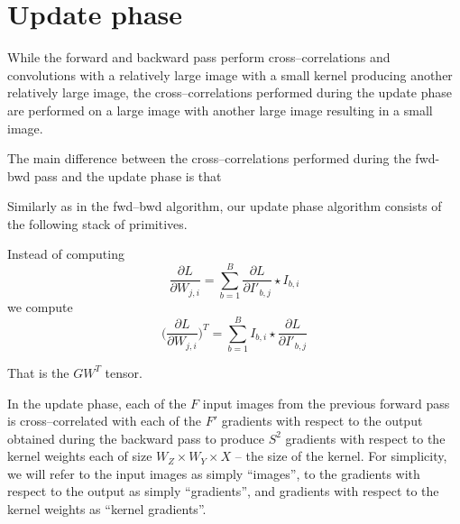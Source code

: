 \section{Update phase}

  While the forward and backward pass perform cross--correlations and
  convolutions with a relatively large image with a small kernel
  producing another relatively large image, the cross--correlations
  performed during the update phase are performed on a large image
  with another large image resulting in a small image.

  The main difference between the cross--correlations performed during
  the fwd-bwd pass and the update phase is that

Similarly as in the fwd--bwd algorithm, our update phase algorithm
  consists of the following stack of primitives.

  Instead of computing
  \[
  \frac{\partial L}{\partial W_{j,i}} = \sum_{b=1}^B
  \frac{\partial L}{\partial I'_{b,j}}  \star I_{b,i}
  \]
  we compute
  \[
  \Bigg( \frac{\partial L}{\partial W_{j,i}} \Bigg)^T = \sum_{b=1}^B
  I_{b,i} \star \frac{\partial L}{\partial I'_{b,j}}
  \]

  That is the $GW^T$ tensor.

  In the update phase, each of the $F$ input images from the previous
  forward pass is cross--correlated with each of the $F'$ gradients
  with respect to the output obtained during the backward pass to
  produce $S^2$ gradients with respect to the kernel weights each of
  size $W_Z \times W_Y \times X$ -- the size of the kernel.  For
  simplicity, we will refer to the input images as simply ``images'',
  to the gradients with respect to the output as simply ``gradients'',
  and gradients with respect to the kernel weights as ``kernel
  gradients''.

